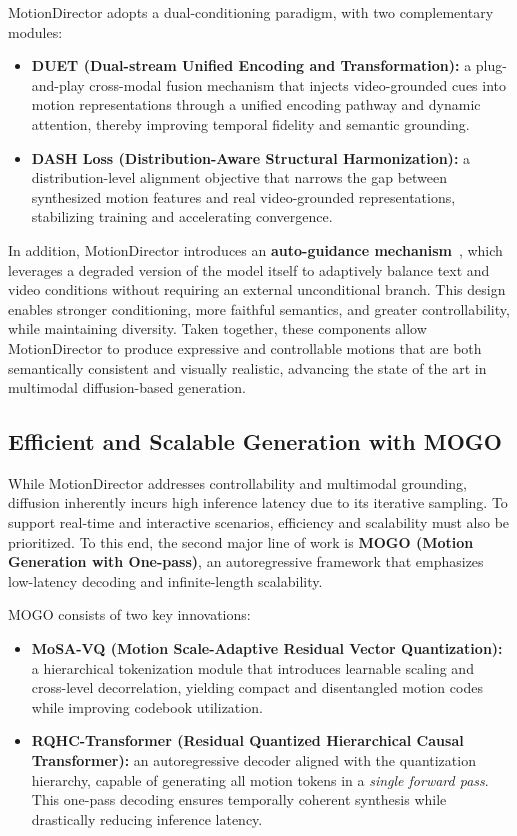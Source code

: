 \documentclass[a4paper,12pt]{article}
\begin{document}
MotionDirector adopts a dual-conditioning paradigm, with two complementary modules:  
\begin{itemize}
    \item \textbf{DUET (Dual-stream Unified Encoding and Transformation):} a plug-and-play cross-modal fusion mechanism that injects video-grounded cues into motion representations through a unified encoding pathway and dynamic attention, thereby improving temporal fidelity and semantic grounding.  
    \item \textbf{DASH Loss (Distribution-Aware Structural Harmonization):} a distribution-level alignment objective that narrows the gap between synthesized motion features and real video-grounded representations, stabilizing training and accelerating convergence.  
\end{itemize}
In addition, MotionDirector introduces an \textbf{auto-guidance mechanism}~\cite{karras2024guiding}, which leverages a degraded version of the model itself to adaptively balance text and video conditions without requiring an external unconditional branch. This design enables stronger conditioning, more faithful semantics, and greater controllability, while maintaining diversity. Taken together, these components allow MotionDirector to produce expressive and controllable motions that are both semantically consistent and visually realistic, advancing the state of the art in multimodal diffusion-based generation.

\subsection{Efficient and Scalable Generation with MOGO}
While MotionDirector addresses controllability and multimodal grounding, diffusion inherently incurs high inference latency due to its iterative sampling. To support real-time and interactive scenarios, efficiency and scalability must also be prioritized. To this end, the second major line of work is \textbf{MOGO (Motion Generation with One-pass)}, an autoregressive framework that emphasizes low-latency decoding and infinite-length scalability.  

MOGO consists of two key innovations:  
\begin{itemize}
    \item \textbf{MoSA-VQ (Motion Scale-Adaptive Residual Vector Quantization):} a hierarchical tokenization module that introduces learnable scaling and cross-level decorrelation, yielding compact and disentangled motion codes while improving codebook utilization.  
    \item \textbf{RQHC-Transformer (Residual Quantized Hierarchical Causal Transformer):} an autoregressive decoder aligned with the quantization hierarchy, capable of generating all motion tokens in a \emph{single forward pass}. This one-pass decoding ensures temporally coherent synthesis while drastically reducing inference latency.  
\end{itemize}
\end{document}
